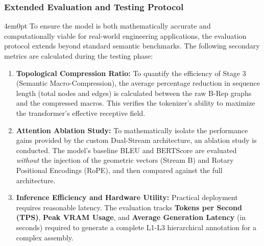 		\subsubsection{Extended Evaluation and Testing Protocol}
			\begin{indentedblock}{4em}{0pt}
				To ensure the model is both mathematically accurate and computationally viable for real-world engineering applications, the evaluation protocol extends beyond standard semantic benchmarks. The following secondary metrics are calculated during the testing phase:
				
				\begin{sloppypar}
					\begin{enumerate}
						\item \textbf{Topological Compression Ratio:} To quantify the efficiency of Stage 3 (Semantic Macro-Compression), the average percentage reduction in sequence length (total nodes and edges) is calculated between the raw B-Rep graphs and the compressed macros. This verifies the tokenizer's ability to maximize the transformer's effective receptive field.
						
						\item \textbf{Attention Ablation Study:} To mathematically isolate the performance gains provided by the custom Dual-Stream architecture, an ablation study is conducted. The model's baseline BLEU and BERTScore are evaluated \textit{without} the injection of the geometric vectors (Stream B) and Rotary Positional Encodings (RoPE), and then compared against the full architecture.
						
						\item \textbf{Inference Efficiency and Hardware Utility:} Practical deployment requires reasonable latency. The evaluation tracks \textbf{Tokens per Second (TPS)}, \textbf{Peak VRAM Usage}, and \textbf{Average Generation Latency} (in seconds) required to generate a complete L1-L3 hierarchical annotation for a complex assembly.
					\end{enumerate}
				\end{sloppypar}
				
			\end{indentedblock}
